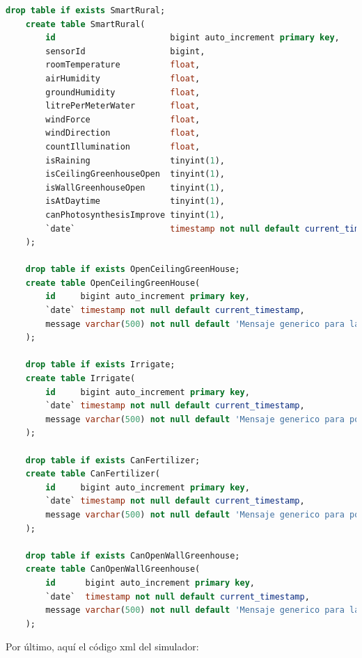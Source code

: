 \documentclass[a4paper,12pt]{article}
\begin{document}
\begin{lstlisting}[language=sql,caption=SmartRural.sql]
    drop table if exists SmartRural;
    create table SmartRural(
        id                       bigint auto_increment primary key,
        sensorId                 bigint,
        roomTemperature          float,
        airHumidity              float,
        groundHumidity           float,
        litrePerMeterWater       float,
        windForce                float,
        windDirection            float,
        countIllumination        float,
        isRaining                tinyint(1),
        isCeilingGreenhouseOpen  tinyint(1),
        isWallGreenhouseOpen     tinyint(1),
        isAtDaytime              tinyint(1),
        canPhotosynthesisImprove tinyint(1),
        `date`                   timestamp not null default current_timestamp
    );

    drop table if exists OpenCeilingGreenHouse;
    create table OpenCeilingGreenHouse(
        id     bigint auto_increment primary key,
        `date` timestamp not null default current_timestamp,
        message varchar(500) not null default 'Mensaje generico para la apertura del techo del invernadero'
    );

    drop table if exists Irrigate;
    create table Irrigate(
        id     bigint auto_increment primary key,
        `date` timestamp not null default current_timestamp,
        message varchar(500) not null default 'Mensaje generico para poder regar el invernadero'
    );

    drop table if exists CanFertilizer;
    create table CanFertilizer(
        id     bigint auto_increment primary key,
        `date` timestamp not null default current_timestamp,
        message varchar(500) not null default 'Mensaje generico para poder fertilizar el invernadero'
    );

    drop table if exists CanOpenWallGreenhouse;
    create table CanOpenWallGreenhouse(
        id      bigint auto_increment primary key,
        `date`  timestamp not null default current_timestamp,
        message varchar(500) not null default 'Mensaje generico para la apertura de la pared del invernadero'
    );
\end{lstlisting}

Por último, aquí el código xml del simulador:
\end{document}
